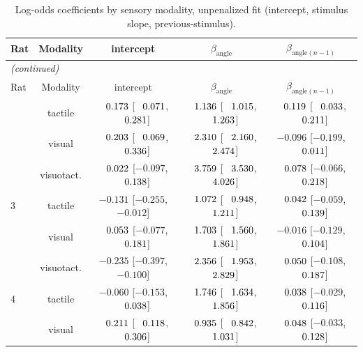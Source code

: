 \begin{longtable}{lcccc}
\caption{Log-odds coefficients by sensory modality, unpenalized fit (intercept, stimulus slope, previous-stimulus).}
\label{tab:table2a_modality_coeffs} \\
\toprule
Rat & Modality & intercept & $\beta_{\mathrm{angle}}$ & $\beta_{\mathrm{angle}(n-1)}$ \\
\midrule
\endfirsthead
\multicolumn{5}{l}{\textit{(continued)}} \\
\toprule
Rat & Modality & intercept & $\beta_{\mathrm{angle}}$ & $\beta_{\mathrm{angle}(n-1)}$ \\
\midrule
\endhead
\bottomrule
\endfoot
\bottomrule
\endlastfoot
2 & tactile & $\hphantom{-}0.173$ [$\hphantom{-}0.071$, $\hphantom{-}0.281$] & $\hphantom{-}1.136$ [$\hphantom{-}1.015$, $\hphantom{-}1.263$] & \cellcolor{gray!15}$\hphantom{-}0.119$ [$\hphantom{-}0.033$, $\hphantom{-}0.211$] \\
 & visual & $\hphantom{-}0.203$ [$\hphantom{-}0.069$, $\hphantom{-}0.336$] & $\hphantom{-}2.310$ [$\hphantom{-}2.160$, $\hphantom{-}2.474$] & \cellcolor{gray!15}$-0.096$ [$-0.199$, $\hphantom{-}0.011$] \\
 & visuotact. & $\hphantom{-}0.022$ [$-0.097$, $\hphantom{-}0.138$] & $\hphantom{-}3.759$ [$\hphantom{-}3.530$, $\hphantom{-}4.026$] & \cellcolor{gray!15}$\hphantom{-}0.078$ [$-0.066$, $\hphantom{-}0.218$] \\
\midrule
3 & tactile & $-0.131$ [$-0.255$, $-0.012$] & $\hphantom{-}1.072$ [$\hphantom{-}0.948$, $\hphantom{-}1.211$] & $\hphantom{-}0.042$ [$-0.059$, $\hphantom{-}0.139$] \\
 & visual & $\hphantom{-}0.053$ [$-0.077$, $\hphantom{-}0.181$] & $\hphantom{-}1.703$ [$\hphantom{-}1.560$, $\hphantom{-}1.861$] & $-0.016$ [$-0.129$, $\hphantom{-}0.104$] \\
 & visuotact. & $-0.235$ [$-0.397$, $-0.100$] & $\hphantom{-}2.356$ [$\hphantom{-}1.953$, $\hphantom{-}2.829$] & $\hphantom{-}0.050$ [$-0.108$, $\hphantom{-}0.187$] \\
\midrule
4 & tactile & $-0.060$ [$-0.153$, $\hphantom{-}0.038$] & $\hphantom{-}1.746$ [$\hphantom{-}1.634$, $\hphantom{-}1.856$] & \cellcolor{gray!15}$\hphantom{-}0.038$ [$-0.029$, $\hphantom{-}0.116$] \\
 & visual & $\hphantom{-}0.211$ [$\hphantom{-}0.118$, $\hphantom{-}0.306$] & $\hphantom{-}0.935$ [$\hphantom{-}0.842$, $\hphantom{-}1.031$] & \cellcolor{gray!15}$\hphantom{-}0.048$ [$-0.033$, $\hphantom{-}0.128$] \\

\end{longtable}
